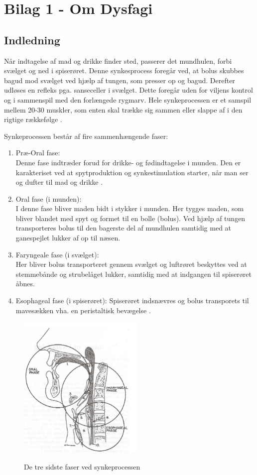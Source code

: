 \documentclass[main.tex]{subfiles}
\begin{document}
\chapter*{Bilag 1 - Om Dysfagi}
\label{Bilag1}
\section*{Indledning}
Når indtagelse af mad og drikke finder sted, passerer det mundhulen, forbi svælget og ned i spiserøret. Denne synkesprocess foregår ved, at bolus skubbes bagud mod svælget ved hjælp af tungen, som presser op og bagud. Derefter udløses en refleks pga. sanseceller i svælget. Dette foregår uden for viljens kontrol og i sammenspil med den forlængede rygmarv. Hele synkeprocessen er et samspil mellem 20-30 muskler, som enten skal trække sig sammen eller slappe af i den rigtige rækkefølge \cite{Sand2008MennesketsFysiologi}. 

Synkeprocessen består af fire sammenhængende faser:
\begin{enumerate}
\item Præ-Oral fase:\\
Denne fase indtræder forud for drikke- og fødindtagelse i munden. Den er karakteriset ved at spytproduktion og synkestimulation starter, når man ser og dufter til mad og drikke \cite [s. 12]{Kjaersgaard2013DifficultiesPerspective}.    
\item Oral fase (i munden): \\
I denne fase bliver maden bidt i stykker i munden. Her tygges maden, som bliver blandet med spyt og formet til en bolle (bolus). Ved hjælp af tungen transporteres bolus til den bagerste del af mundhulen samtidig med at ganespejlet lukker af op til næsen.
\item Faryngeale fase (i svælget): \\ Her bliver bolus transporteret gennem svælget og luftrøret beskyttes ved at stemmebånde og strubelåget lukker, samtidig med at indgangen til spiserøret åbnes.     
\item Esophageal fase (i spiserøret):
Spiserøret indsnævres og bolus transporets til mavesækken vha. en peristaltisk bevægelse \cite [s. 395]{Sand2008MennesketsFysiologi}.
\end{enumerate}

\begin{figure}[H]
\centering
{\includegraphics[width=6cm]
{Figure/dysfagi3faser}}
\caption{De tre sidste faser ved synkeprocessen\cite{Bass1992Dysphagia:Management}}
\label{trefaser}
\end{figure}
\end{document}
